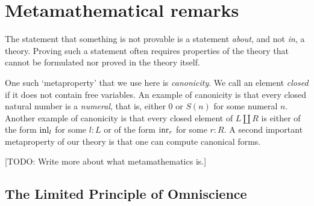 \chapter{Metamathematical remarks}
\label{app:metamath}

The statement that something is not provable is a statement \emph{about},
and not \emph{in}, a theory. Proving such a statement often requires
properties of the theory that cannot be formulated nor proved in the theory itself.

One such `metaproperty' that we use here is \emph{canonicity}.
We call an element \emph{closed} if it does not contain free variables.
An example of canonicity is that every closed natural number is a \emph{numeral},
that is, either $0$ or $S(n)$ for some numeral $n$.
Another example of canonicity is that every closed element of $L\coprod R$
is either of the form $\inl{l}$ for some $l:L$ or
of the form $\inr{r}$ for some $r:R$.
A second important metaproperty of our theory is that one can compute canonical forms.

[TODO: Write more about what metamathematics is.]

\section{The Limited Principle of Omniscience}
\label{sec:LPO}

